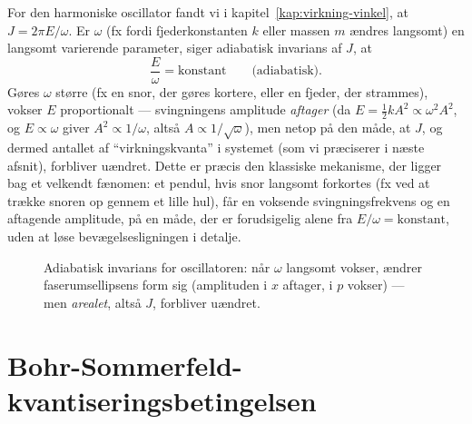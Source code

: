 \begin{eksempel}
For den harmoniske oscillator fandt vi i
kapitel~\ref{kap:virkning-vinkel}, at $J=2\pi E/\omega$. Er $\omega$
(fx fordi fjederkonstanten $k$ eller massen $m$ ændres langsomt) en
langsomt varierende parameter, siger adiabatisk invarians af $J$, at
\begin{equation}
  \frac{E}{\omega} = \text{konstant} \qquad\text{(adiabatisk)}.
\end{equation}
Gøres $\omega$ større (fx en snor, der gøres kortere, eller en fjeder,
der strammes), vokser $E$ proportionalt — svingningens amplitude
\emph{aftager} (da $E=\frac12kA^2\propto\omega^2A^2$, og
$E\propto\omega$ giver $A^2\propto1/\omega$, altså $A\propto1/\sqrt\omega$),
men netop på den måde, at $J$, og dermed antallet af ``virkningskvanta''
i systemet (som vi præciserer i næste afsnit), forbliver uændret.
Dette er præcis den klassiske mekanisme, der ligger bag et velkendt
fænomen: et pendul, hvis snor langsomt forkortes (fx ved at trække
snoren op gennem et lille hul), får en voksende svingningsfrekvens og
en aftagende amplitude, på en måde, der er forudsigelig alene fra
$E/\omega=\text{konstant}$, uden at løse bevægelsesligningen i detalje.
\end{eksempel}

\begin{figure}[htbp]
  \centering
  \caption{Adiabatisk invarians for oscillatoren: når $\omega$ langsomt
  vokser, ændrer faserumsellipsens form sig (amplituden i $x$
  aftager, i $p$ vokser) — men \emph{arealet}, altså $J$, forbliver
  uændret.}
  \label{fig:adiabatisk-ellipse}
\end{figure}

\section{Bohr-Sommerfeld-kvantiseringsbetingelsen}

